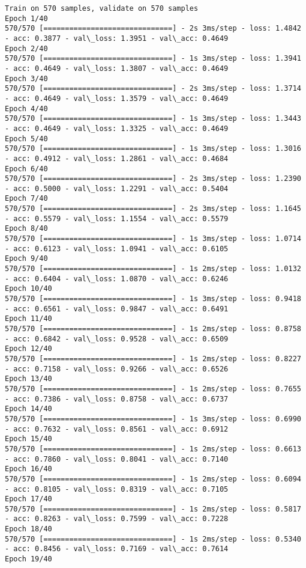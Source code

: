 \documentclass[11pt]{article}
\begin{document}
    \begin{Verbatim}[commandchars=\\\{\}]
Train on 570 samples, validate on 570 samples
Epoch 1/40
570/570 [==============================] - 2s 3ms/step - loss: 1.4842 - acc: 0.3877 - val\_loss: 1.3951 - val\_acc: 0.4649
Epoch 2/40
570/570 [==============================] - 1s 3ms/step - loss: 1.3941 - acc: 0.4649 - val\_loss: 1.3807 - val\_acc: 0.4649
Epoch 3/40
570/570 [==============================] - 2s 3ms/step - loss: 1.3714 - acc: 0.4649 - val\_loss: 1.3579 - val\_acc: 0.4649
Epoch 4/40
570/570 [==============================] - 1s 3ms/step - loss: 1.3443 - acc: 0.4649 - val\_loss: 1.3325 - val\_acc: 0.4649
Epoch 5/40
570/570 [==============================] - 1s 3ms/step - loss: 1.3016 - acc: 0.4912 - val\_loss: 1.2861 - val\_acc: 0.4684
Epoch 6/40
570/570 [==============================] - 2s 3ms/step - loss: 1.2390 - acc: 0.5000 - val\_loss: 1.2291 - val\_acc: 0.5404
Epoch 7/40
570/570 [==============================] - 2s 3ms/step - loss: 1.1645 - acc: 0.5579 - val\_loss: 1.1554 - val\_acc: 0.5579
Epoch 8/40
570/570 [==============================] - 1s 3ms/step - loss: 1.0714 - acc: 0.6123 - val\_loss: 1.0941 - val\_acc: 0.6105
Epoch 9/40
570/570 [==============================] - 1s 2ms/step - loss: 1.0132 - acc: 0.6404 - val\_loss: 1.0870 - val\_acc: 0.6246
Epoch 10/40
570/570 [==============================] - 1s 3ms/step - loss: 0.9418 - acc: 0.6561 - val\_loss: 0.9847 - val\_acc: 0.6491
Epoch 11/40
570/570 [==============================] - 1s 2ms/step - loss: 0.8758 - acc: 0.6842 - val\_loss: 0.9528 - val\_acc: 0.6509
Epoch 12/40
570/570 [==============================] - 1s 2ms/step - loss: 0.8227 - acc: 0.7158 - val\_loss: 0.9266 - val\_acc: 0.6526
Epoch 13/40
570/570 [==============================] - 1s 2ms/step - loss: 0.7655 - acc: 0.7386 - val\_loss: 0.8758 - val\_acc: 0.6737
Epoch 14/40
570/570 [==============================] - 1s 3ms/step - loss: 0.6990 - acc: 0.7632 - val\_loss: 0.8561 - val\_acc: 0.6912
Epoch 15/40
570/570 [==============================] - 1s 2ms/step - loss: 0.6613 - acc: 0.7860 - val\_loss: 0.8041 - val\_acc: 0.7140
Epoch 16/40
570/570 [==============================] - 1s 2ms/step - loss: 0.6094 - acc: 0.8105 - val\_loss: 0.8319 - val\_acc: 0.7105
Epoch 17/40
570/570 [==============================] - 1s 2ms/step - loss: 0.5817 - acc: 0.8263 - val\_loss: 0.7599 - val\_acc: 0.7228
Epoch 18/40
570/570 [==============================] - 1s 2ms/step - loss: 0.5340 - acc: 0.8456 - val\_loss: 0.7169 - val\_acc: 0.7614
Epoch 19/40

\end{Verbatim}
\end{document}
